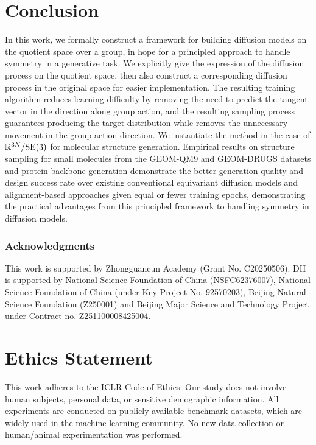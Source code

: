 \documentclass{article} %
\newcommand{\SE}{\mathrm{SE}}
\begin{document}
\vspace{-3pt}
\section{Conclusion}
In this work, we formally construct a framework for building diffusion models on the quotient space over a group, in hope for a principled approach to handle symmetry in a generative task. We explicitly give the expression of the diffusion process on the quotient space, then also construct a corresponding diffusion process in the original space for easier implementation. The resulting training algorithm reduces learning difficulty by removing the need to predict the tangent vector in the direction along group action, and the resulting sampling process guarantees producing the target distribution while removes the unnecessary movement in the group-action direction.
We instantiate the method in the case of $\bbR^{3N}/\SE(3)$ for molecular structure generation.
Empirical results on structure sampling for small molecules from the GEOM-QM9 and GEOM-DRUGS datasets and protein backbone generation demonstrate the better generation quality and design success rate over existing conventional equivariant diffusion models and alignment-based approaches given equal or fewer training epochs, demonstrating the practical advantages from this principled framework to handling symmetry in diffusion models.



\subsubsection*{Acknowledgments}
This work is supported by Zhongguancun Academy (Grant No. C20250506). DH is supported by National Science Foundation of China (NSFC62376007), National Science Foundation of China (under Key Project No. 92570203), Beijing Natural Science Foundation (Z250001) and Beijing Major Science and Technology Project under Contract no. Z251100008425004.

\section{Ethics Statement}
This work adheres to the ICLR Code of Ethics.
Our study does not involve human subjects, personal data, or sensitive demographic information. 
All experiments are conducted on publicly available benchmark datasets, which are widely used in the machine learning community. 
No new data collection or human/animal experimentation was performed.
\end{document}
